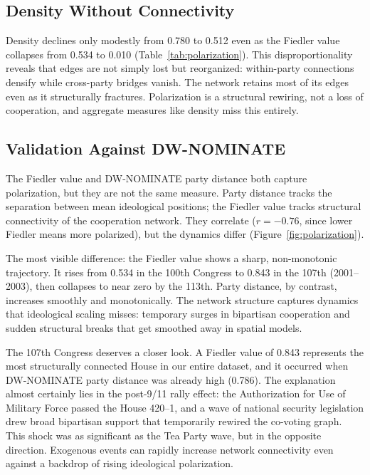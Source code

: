 \documentclass[12pt, a4paper]{article}
\begin{document}
\subsection{Density Without Connectivity}

Density declines only modestly from 0.780 to 0.512 even as the Fiedler value collapses from 0.534 to 0.010 (Table~\ref{tab:polarization}). This disproportionality reveals that edges are not simply lost but reorganized: within-party connections densify while cross-party bridges vanish. The network retains most of its edges even as it structurally fractures. Polarization is a structural rewiring, not a loss of cooperation, and aggregate measures like density miss this entirely.

\subsection{Validation Against DW-NOMINATE}

The Fiedler value and DW-NOMINATE party distance both capture polarization, but they are not the same measure. Party distance tracks the separation between mean ideological positions; the Fiedler value tracks structural connectivity of the cooperation network. They correlate ($r = -0.76$, since lower Fiedler means more polarized), but the dynamics differ (Figure~\ref{fig:polarization}).

The most visible difference: the Fiedler value shows a sharp, non-monotonic trajectory. It rises from 0.534 in the 100th Congress to 0.843 in the 107th (2001--2003), then collapses to near zero by the 113th. Party distance, by contrast, increases smoothly and monotonically. The network structure captures dynamics that ideological scaling misses: temporary surges in bipartisan cooperation and sudden structural breaks that get smoothed away in spatial models.

The 107th Congress deserves a closer look. A Fiedler value of 0.843 represents the most structurally connected House in our entire dataset, and it occurred when DW-NOMINATE party distance was already high (0.786). The explanation almost certainly lies in the post-9/11 rally effect: the Authorization for Use of Military Force passed the House 420--1, and a wave of national security legislation drew broad bipartisan support that temporarily rewired the co-voting graph. This shock was as significant as the Tea Party wave, but in the opposite direction. Exogenous events can rapidly increase network connectivity even against a backdrop of rising ideological polarization.
\end{document}
